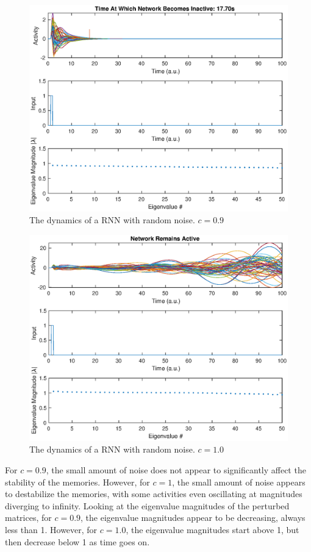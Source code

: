 \documentclass[11pt, oneside]{article}
\begin{document}
\begin{figure}[H]
\includegraphics[width=1\textwidth]{RNN09randnoise.eps}
\caption{The dynamics of a RNN with random noise. $c = 0.9$}
\label{fig:RNN09randnoise}
\end{figure}

\begin{figure}[H]
\includegraphics[width=1\textwidth]{RNN10randnoise.eps}
\caption{The dynamics of a RNN with random noise. $c = 1.0$}
\label{fig:RNN10randnoise}
\end{figure}

For $c=0.9$, the small amount of noise does not appear to significantly affect the stability of the memories. However, for $c=1$, the small amount of noise appears to destabilize the memories, with some activities even oscillating at magnitudes diverging to infinity. Looking at the eigenvalue magnitudes of the perturbed matrices, for $c=0.9$, the eigenvalue magnitudes appear to be decreasing, always less than 1. However, for $c=1.0$, the eigenvalue magnitudes start above 1, but then decrease below 1 as time goes on.
\end{document}
